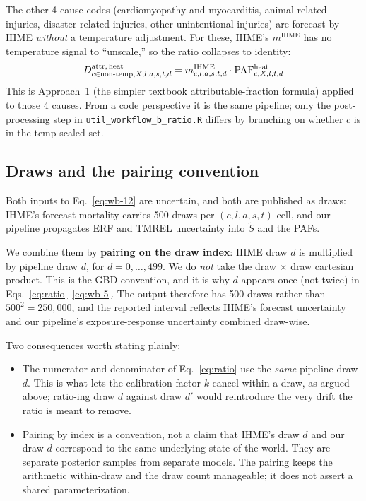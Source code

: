 \documentclass[11pt]{article}
\newcommand{\PAF}{\text{PAF}}
\newcommand{\mIHME}{m^{\text{IHME}}}
\begin{document}
The other 4 cause codes (cardiomyopathy and myocarditis, animal-related
injuries, disaster-related injuries, other unintentional injuries) are
forecast by IHME \emph{without} a temperature adjustment. For these, IHME's $\mIHME$ has no temperature signal to
``unscale,'' so the ratio collapses to identity:
\begin{equation}
\mAttr[heat]_{c \in \text{non-temp}, X, l, a, s, t, d}
= \mIHME_{c,l,a,s,t,d} \cdot \PAF^{\text{heat}}_{c,X,l,t,d}
\label{eq:wb-5}
\end{equation}
This is Approach~1 (the simpler textbook attributable-fraction formula)
applied to those 4 causes. From a code perspective it is the same
pipeline; only the post-processing step in
\texttt{util\_workflow\_b\_ratio.R} differs by branching on whether
$c$ is in the temp-scaled set.

\subsection{Draws and the pairing convention}
\label{sec:draws}

Both inputs to Eq.~\eqref{eq:wb-12} are uncertain, and both are published
as draws: IHME's forecast mortality carries 500 draws per
$(c, l, a, s, t)$ cell, and our pipeline propagates ERF and TMREL
uncertainty into $\tilde S$ and the PAFs.

We combine them by \textbf{pairing on the draw index}: IHME draw $d$ is
multiplied by pipeline draw $d$, for $d = 0, \ldots, 499$. We do
\emph{not} take the draw $\times$ draw cartesian product. This is the GBD
convention, and it is why $d$ appears once (not twice) in
Eqs.~\eqref{eq:ratio}--\eqref{eq:wb-5}. The output therefore has 500
draws rather than $500^2 = 250{,}000$, and the reported interval reflects
IHME's forecast uncertainty and our pipeline's exposure-response
uncertainty combined draw-wise.

Two consequences worth stating plainly:
\begin{itemize}[itemsep=2pt]
  \item The numerator and denominator of Eq.~\eqref{eq:ratio} use the
    \emph{same} pipeline draw $d$. This is what lets the calibration
    factor $k$ cancel within a draw, as argued above; ratio-ing draw $d$
    against draw $d'$ would reintroduce the very drift the ratio is meant
    to remove.
  \item Pairing by index is a convention, not a claim that IHME's draw
    $d$ and our draw $d$ correspond to the same underlying state of the
    world. They are separate posterior samples from separate models. The
    pairing keeps the arithmetic within-draw and the draw count
    manageable; it does not assert a shared parameterization.
\end{itemize}
\end{document}

